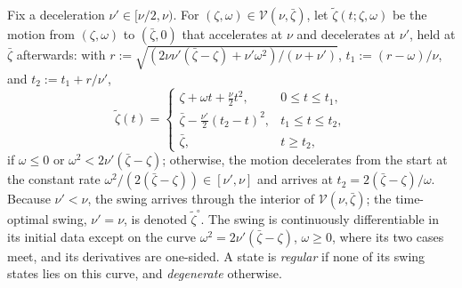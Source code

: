 Fix a deceleration $\nu'\in[\nu/2,\nu)$. For $(\zeta,\omega)\in\mathcal{V}(\nu,\bar\zeta)$, let $\tilde\zeta(t;\zeta,\omega)$ be the motion from $(\zeta,\omega)$ to $(\bar\zeta,0)$ that accelerates at $\nu$ and decelerates at $\nu'$, held at $\bar\zeta$ afterwards: with $r:=\sqrt{(2\nu\nu'(\bar\zeta-\zeta)+\nu'\omega^2)/(\nu+\nu')}$, $t_1:=(r-\omega)/\nu$, and $t_2:=t_1+r/\nu'$,
\begin{equation}
\tilde\zeta(t)=\begin{cases}
\zeta+\omega t+\tfrac{\nu}{2}t^2, & 0\le t\le t_1,\\
\bar\zeta-\tfrac{\nu'}{2}(t_2-t)^2, & t_1\le t\le t_2,\\
\bar\zeta, & t\ge t_2,
\end{cases}
\label{eq:profile}
\end{equation}
if $\omega\le0$ or $\omega^2<2\nu'(\bar\zeta-\zeta)$; otherwise, the motion decelerates from the start at the constant rate $\omega^2/(2(\bar\zeta-\zeta))\in[\nu',\nu]$ and arrives at $t_2=2(\bar\zeta-\zeta)/\omega$. Because $\nu'<\nu$, the swing arrives through the interior of $\mathcal V(\nu,\bar\zeta)$; the time-optimal swing, $\nu'=\nu$, is denoted $\tilde\zeta^{\circ}$. The swing is continuously differentiable in its initial data except on the curve $\omega^2=2\nu'(\bar\zeta-\zeta)$, $\omega\ge0$, where its two cases meet, and its derivatives are one-sided. A state is \emph{regular} if none of its swing states lies on this curve, and \emph{degenerate} otherwise.

